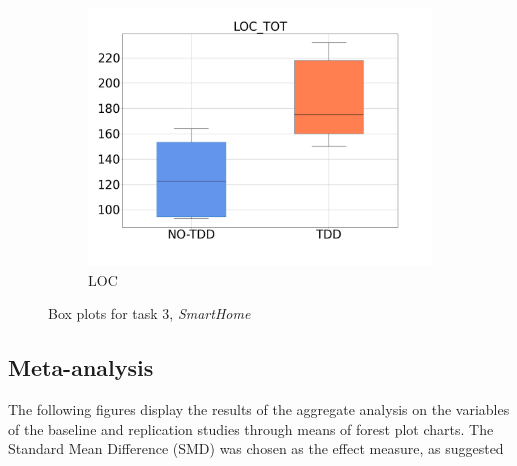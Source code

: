 \begin{figure}[H]
\begin{subfigure}{0.33\textwidth}
        \includegraphics[width=\linewidth]{figures/box_plots/task3/LOC.png}
        \caption{LOC}
        \label{bp_task3_loc}
    \end{subfigure}
    \caption{Box plots for task 3, \textit{SmartHome}}
    \label{box_plots_task3}
\end{figure}





\subsection{Meta-analysis}
The following figures display the results of the aggregate analysis on the variables of the baseline and replication studies through means of forest plot charts. The Standard Mean Difference (SMD) was chosen as the effect measure, as suggested 


